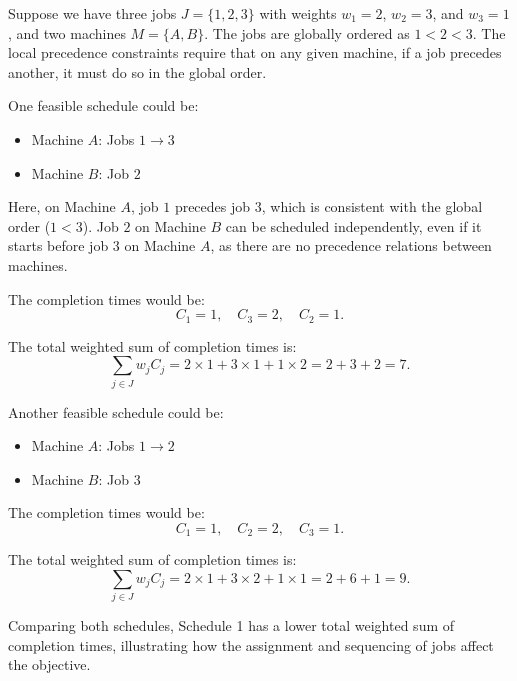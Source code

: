Suppose we have three jobs $J = \{1, 2, 3\}$ with weights $w_1 = 2$, $w_2 = 3$, and $w_3 = 1$, and two machines $M = \{A, B\}$. The jobs are globally ordered as $1 < 2 < 3$. The local precedence constraints require that on any given machine, if a job precedes another, it must do so in the global order.

One feasible schedule could be:

\begin{example}[Schedule 1] \hfill
    \begin{itemize}
        \item Machine $A$: Jobs $1 \rightarrow 3$
        \item Machine $B$: Job $2$
    \end{itemize}

    Here, on Machine $A$, job $1$ precedes job $3$, which is consistent with the global order ($1 < 3$). Job $2$ on Machine $B$ can be scheduled independently, even if it starts before job $3$ on Machine $A$, as there are no precedence relations between machines.

    The completion times would be:
    \[
        C_1 = 1, \quad C_3 = 2, \quad C_2 = 1.
    \]

    The total weighted sum of completion times is:
    \[
        \sum_{j \in J} w_j C_j = 2 \times 1 + 3 \times 1 + 1 \times 2 = 2 + 3 + 2 = 7.
    \]
\end{example}

Another feasible schedule could be:

\begin{example}[Schedule 2] \hfill
    \begin{itemize}
        \item Machine $A$: Jobs $1 \rightarrow 2$
        \item Machine $B$: Job $3$
    \end{itemize}

    The completion times would be:
    \[
        C_1 = 1, \quad C_2 = 2, \quad C_3 = 1.
    \]

    The total weighted sum of completion times is:
    \[
        \sum_{j \in J} w_j C_j = 2 \times 1 + 3 \times 2 + 1 \times 1 = 2 + 6 + 1 = 9.
    \]
\end{example}

Comparing both schedules, Schedule 1 has a lower total weighted sum of completion times, illustrating how the assignment and sequencing of jobs affect the objective.


